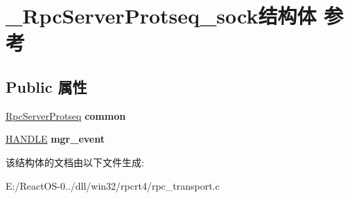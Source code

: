 \hypertarget{struct___rpc_server_protseq__sock}{}\section{\+\_\+\+Rpc\+Server\+Protseq\+\_\+sock结构体 参考}
\label{struct___rpc_server_protseq__sock}
\subsection*{Public 属性}
\begin{DoxyCompactItemize}
\item 
\mbox{\label{struct___rpc_server_protseq__sock_ab8b82c978e1156d004ac77e95a8cf5e0}} 
\hyperlink{struct___rpc_server_protseq}{Rpc\+Server\+Protseq} {\bfseries common}
\item 
\mbox{\label{struct___rpc_server_protseq__sock_a466f208ad11c54a68e094a09f6875513}} 
\hyperlink{interfacevoid}{H\+A\+N\+D\+LE} {\bfseries mgr\+\_\+event}
\end{DoxyCompactItemize}


该结构体的文档由以下文件生成\+:\begin{DoxyCompactItemize}
\item 
E\+:/\+React\+O\+S-\/0../dll/win32/rpcrt4/rpc\+\_\+transport.\+c\end{DoxyCompactItemize}
